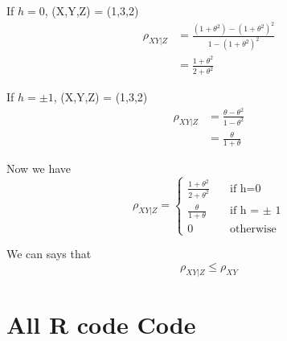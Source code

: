 \documentclass[11pt, oneside]{article}   	%
\begin{document}
If $h=0$, (X,Y,Z) = (1,3,2)
\begin{equation}
\begin{aligned}
\rho_{XY|Z} &= \frac{(1+\theta^{2}) - (1+\theta^{2})^{2}}{1-(1+\theta^{2})^{2}} \\
&=\frac{1+\theta^{2}}{2+\theta^{2}}
\end{aligned}
\end{equation}

If $h = \pm 1$, (X,Y,Z) = (1,3,2)
\begin{equation}
\begin{aligned}
\rho_{XY|Z} &= \frac{\theta - \theta^{2}}{1-\theta^{2}} \\
&=\frac{\theta}{1+\theta}
\end{aligned}
\end{equation}

Now we have 
\begin{equation}
 \rho_{XY|Z} =
     \begin{cases}
       \frac{1+\theta^{2}}{2+\theta^{2}} &\quad\text{if h=0}\\
       \frac{\theta}{1+\theta}&\quad\text{if h = $\pm$ 1} \\
       0 &\quad\text{otherwise}
     \end{cases}
\end{equation}

We can says that
\begin{equation}
 \rho_{XY|Z} \leq  \rho_{XY} 
\end{equation}



\section{All R code Code}
\end{document}
